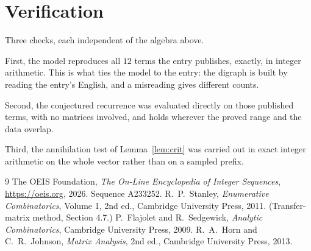\documentclass[11pt,a4paper]{article}
\theoremstyle{plain}
\theoremstyle{definition}
\begin{document}
\section{Verification}

Three checks, each independent of the algebra above.

First, the model reproduces all $12$ terms the entry publishes, exactly, in integer
arithmetic. This is what ties the model to the entry: the digraph is built by reading the
entry's English, and a misreading gives different counts.

Second, the conjectured recurrence was evaluated directly on those published terms, with no
matrices involved, and holds wherever the proved range and the data overlap.

Third, the annihilation test of Lemma~\ref{lem:crit} was carried out in exact integer
arithmetic on the whole vector rather than on a sampled prefix.

\begin{thebibliography}{9}
 The OEIS Foundation, \emph{The On-Line Encyclopedia of Integer
Sequences}, \url{https://oeis.org}, 2026. Sequence A233252.
 R.~P.~Stanley, \emph{Enumerative Combinatorics}, Volume 1, 2nd ed.,
Cambridge University Press, 2011. (Transfer-matrix method, Section 4.7.)
 P.~Flajolet and R.~Sedgewick, \emph{Analytic Combinatorics}, Cambridge
University Press, 2009.
 R.~A.~Horn and C.~R.~Johnson, \emph{Matrix Analysis}, 2nd ed., Cambridge
University Press, 2013.
\end{thebibliography}
\end{document}
